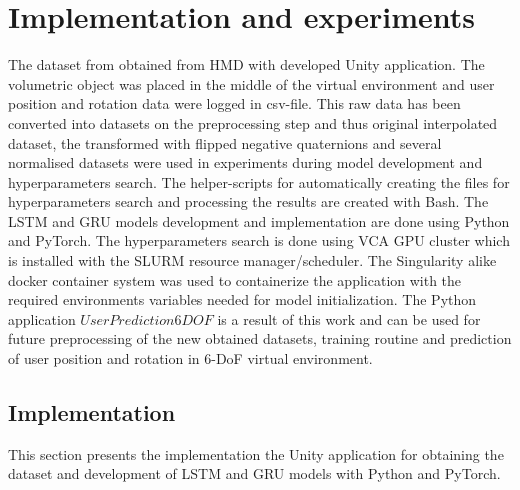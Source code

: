 \chapter{Implementation and experiments}
\label{sec:imp}

The dataset from obtained from HMD with developed Unity application. The volumetric object was placed in the middle of the virtual environment and user position and rotation data were logged in csv-file. This raw data has been converted into datasets on the preprocessing step and thus original interpolated dataset, the transformed with flipped negative quaternions and several normalised datasets were used in experiments during model development and hyperparameters search. The helper-scripts for automatically creating the files for hyperparameters search and processing the results are created with Bash. The LSTM and GRU models development and implementation are done using Python and PyTorch. The hyperparameters search is done using VCA GPU cluster which is installed with the SLURM resource manager/scheduler. The Singularity alike docker container system was used to containerize the application with the required environments variables needed for model initialization. The Python application $UserPrediction6DOF$ is a result of this work and can be used for future preprocessing of the new obtained datasets, training routine and prediction of user position and rotation in 6-DoF virtual environment. 

\section{Implementation}
\label{sec:imp:programming}
This section presents the implementation the Unity application for obtaining the dataset and development of LSTM and GRU models with Python and PyTorch. 

